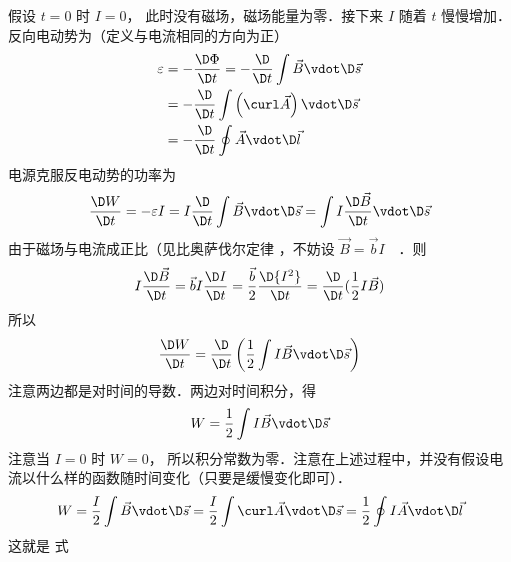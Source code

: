 假设 $t = 0$ 时 $I = 0$， 此时没有磁场，磁场能量为零．接下来 $I$ 随着 $t$ 慢慢增加．反向电动势为（定义与电流相同的方向为正）
\begin{equation}\label{BEng_eq2}
\begin{array}{l}
\begin{split}
\varepsilon  &=  - \frac{{\D\Phi }}{{\D t}} =  - \frac{\D }{{\D t}}\int {\vec B \vdot \D \vec s} \\
&=  - \frac{\D}{{\D t}}\int {\left( {\curl \vec A} \right) \vdot \D\vec s} \\
&=  - \frac{\D}{{\D t}}\oint {\vec A \vdot \D\vec l}
\end{split}  
\end{array}
\end{equation}
电源克服反电动势的功率为
\begin{equation}\label{BEng_eq3}
\frac{{\D W}}{{\D t}} =  - \varepsilon I = I\frac{\D}{{\D t}}\int {\vec B \vdot \D\vec s}  = \int {I\frac{{\D\vec B}}{{\D t}} \vdot \D\vec s} 
\end{equation}
由于磁场与电流成正比（见比奥萨伐尔定律%
，不妨设 $\vec B = \vec bI$　．则
\begin{equation}\label{BEng_eq4}
I\frac{{\D\vec B}}{{\D t}} = \vec bI\frac{{\D I}}{{\D t}} = \frac{{\vec b}}{2}\frac{{\D{I^2}}}{{\D t}} = \frac{\D}{{\D t}}(\frac{1}{2}I\vec B)
\end{equation}
所以
\begin{equation}\label{BEng_eq5}
\frac{{\D W}}{{\D t}} = \frac{\D }{{\D t}}\left( {\frac{1}{2}\int {I\vec B \vdot \D\vec s} } \right)
\end{equation}
注意两边都是对时间的导数．两边对时间积分，得
\begin{equation}\label{BEng_eq6}
W = \frac{1}{2}\int {I\vec B \vdot \D \vec s} 
\end{equation}
注意当 $I = 0$ 时 $ W = 0$， 所以积分常数为零．注意在上述过程中，并没有假设电流以什么样的函数随时间变化（只要是缓慢变化即可）．
\begin{equation}\label{BEng_eq7}
W = \frac{I}{2}\int {\vec B \vdot \D\vec s}  = \frac{I}{2}\int {\curl \vec A \vdot \D\vec s}  = \frac{1}{2}\oint {I\vec A \vdot \D\vec l} 
\end{equation}
这就是%
式

 
 
 
 
 
 
 
 
 